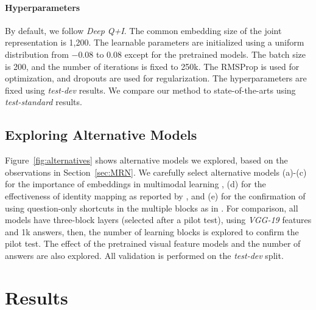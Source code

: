 \documentclass{article}
\begin{document}
\paragraph{Hyperparameters}

By default, we follow \textit{Deep Q+I}. The common embedding size of the joint representation is 1,200. The learnable parameters are initialized using a uniform distribution from $-0.08$ to $0.08$ except for the pretrained models. The batch size is 200, and the number of iterations is fixed to 250k. The RMSProp \cite{Tieleman2012} is used for optimization, and dropouts \cite{Hinton2012,Gal2015} are used for regularization. The hyperparameters are fixed using \textit{test-dev} results. We compare our method to state-of-the-arts using \textit{test-standard} results.

\subsection{Exploring Alternative Models}
\label{subsec:alternatives}

Figure~\ref{fig:alternatives} shows alternative models we explored, based on the observations in Section~\ref{sec:MRN}. We carefully select alternative models (a)-(c) for the importance of embeddings in multimodal learning \cite{Ngiam2011,srivastava12mm}, (d) for the effectiveness of identity mapping as reported by \cite{He2015}, and (e) for the confirmation of using question-only shortcuts in the multiple blocks as in \cite{Yang2015}. For comparison, all models have three-block layers (selected after a pilot test), using \textit{VGG-19} features and 1k answers, then, the number of learning blocks is explored to confirm the pilot test. The effect of the pretrained visual feature models and the number of answers are also explored. All validation is performed on the \textit{test-dev} split.

\section{Results}
\label{sec:results}
\end{document}
